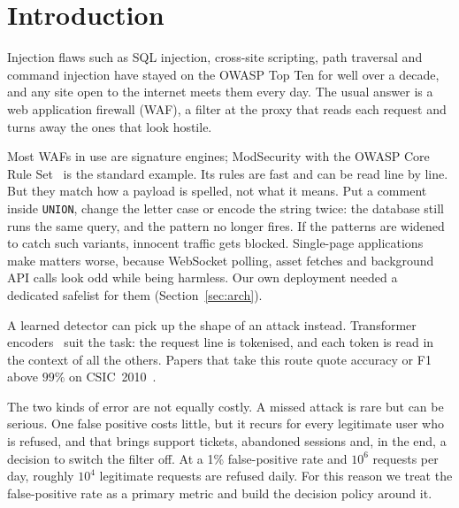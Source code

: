 \documentclass[preprint,11pt]{elsarticle}
\begin{document}
\section{Introduction}
Injection flaws such as SQL injection, cross-site
scripting, path traversal and command injection have stayed on the OWASP
Top Ten for well over a decade, and any site open to the internet meets
them every day. The usual answer is a web application firewall (WAF), a
filter at the proxy that reads each request and turns away the ones that
look hostile.

Most WAFs in use are signature engines; ModSecurity with the OWASP Core
Rule Set~\cite{owaspcrs} is the standard example. Its rules are fast and can
be read line by line. But they match how a payload is spelled, not what it
means. Put a comment inside \texttt{UNION}, change the letter case or
encode the string twice: the database still runs the same query, and the
pattern no longer fires. If the patterns are widened to catch such
variants, innocent traffic gets blocked. Single-page applications make
matters worse, because WebSocket polling, asset fetches and background API
calls look odd while being harmless. Our own deployment needed a dedicated
safelist for them (Section~\ref{sec:arch}).

A learned detector can pick up the shape of an attack instead. Transformer
encoders~\cite{vaswani2017attention,devlin2019bert} suit the task: the
request line is tokenised, and each token is read in the context of all the
others. Papers that take this route quote accuracy or F1 above $99\%$ on
CSIC~2010~\cite{wadbert2026,scireports2024novelxsssqli}.

The two kinds of error are not equally costly. A missed attack is rare but
can be serious. One false positive costs little, but it recurs for every
legitimate user who is refused, and that brings support tickets, abandoned
sessions and, in the end, a decision to switch the filter off. At a 1\%
false-positive rate and $10^6$ requests per day, roughly $10^4$ legitimate
requests are refused daily. For this reason we treat the false-positive
rate as a primary metric and build the decision policy around it.
\end{document}
